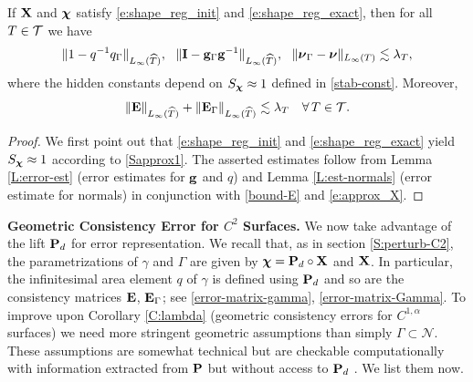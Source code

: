 \begin{corollary} \label{C:lambda}
If ${\bf X}$ and ${\boldsymbol \chi}$ satisfy \eqref{e:shape_reg_init} and
\eqref{e:shape_reg_exact}, then for all $T \in \mathcal{T}$ we have
%
\begin{equation}\label{e:approx_q_g}
  \| 1 - q^{-1}q_\Gamma \|_{L_\infty(\widehat T)} ,~~
  \| {\bf I} - {\bf g}_\Gamma{\bf g}^{-1} \|_{L_\infty(\widehat T)} ,~~
  \| {\boldsymbol \nu}_\Gamma - {\boldsymbol \nu} \|_{L_\infty(T)}
  \lesssim \lambda_T,
\end{equation}
%
where the hidden constants depend on $S_{\boldsymbol \chi} \approx 1$ defined in
\eqref{stab-const}. Moreover,
%
\begin{equation}\label{e:estim_consist}
  \| {\bf E} \|_{L_\infty(\widehat T)} + \| {\bf E}_\Gamma\|_{L_\infty(\widehat T)} \lesssim \lambda_T
  \quad\forall \, T \in \mathcal{T}. 
\end{equation}
\end{corollary}
\begin{proof}
We first point out that \eqref{e:shape_reg_init} and \eqref{e:shape_reg_exact}
yield $S_{\boldsymbol \chi} \approx 1$ according to \eqref{Sapprox1}. The asserted estimates
follow from Lemma \ref{L:error-est} (error estimates for ${\bf g}$ and $q$) and
Lemma \ref{L:est-normals} (error estimate for normals)
in conjunction with \eqref{bound-E} and \eqref{e:approx_X}.
\end{proof}

\medskip\noindent
{\bf Geometric Consistency Error for $C^2$ Surfaces.}
%
We now take advantage of the lift ${\bf P}_d$ for error representation. We recall
that, as in section \ref{S:perturb-C2},
the parametrizations of $\gamma$ and $\Gamma$ are given by
${\boldsymbol \chi} = {\bf P}_d \circ {\bf X}$ and ${\bf X}$. In particular, the infinitesimal area element $q$ of $\gamma$ is defined using ${\bf P}_d$ and so are the consistency matrices ${\bf E}$, ${\bf E}_\Gamma$; see \eqref{error-matrix-gamma}, \eqref{error-matrix-Gamma}.
To improve upon Corollary \ref{C:lambda} (geometric
consistency errors for $C^{1,\alpha}$ surfaces) we need more stringent geometric
assumptions than simply $\Gamma \subset \mathcal N$.
These assumptions are somewhat technical but are checkable computationally
with information extracted from ${\bf P}$ but without access to ${\bf P}_d$ \cite{BD:18}.
We list them now.

